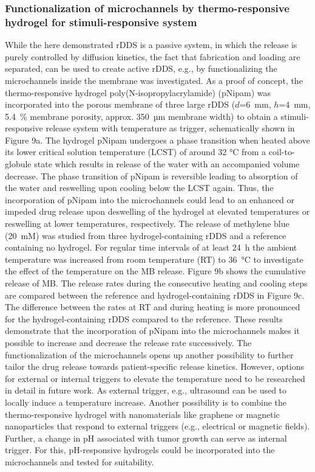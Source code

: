 \subsubsection{Functionalization of microchannels by thermo-responsive hydrogel for stimuli-responsive system}
While the here demonstrated rDDS is a passive system, in which the release is purely controlled by diffusion kinetics, the fact that fabrication and loading are separated, can be used to create active rDDS, e.g., by functionalizing the microchannels inside the membrane was investigated. As a proof of concept, the thermo-responsive hydrogel poly(N-isopropylacrylamide) (pNipam) was incorporated into the porous membrane of three large rDDS ($d$=6~mm, $h$=4~mm, 5.4~\% membrane porosity, approx. 350~µm membrane width) to obtain a stimuli-responsive release system with temperature as trigger, schematically shown in Figure 9a. The hydrogel pNipam undergoes a phase transition when heated above its lower critical solution temperature (LCST) of around 32 °C from a coil-to-globule state which results in release of the water with an accompanied volume decrease\supercite{podewitz2019coil,ilmain1991volume,heskins1968solution}. The phase transition of pNipam is reversible leading to absorption of the water and reswelling upon cooling below the LCST again. Thus, the incorporation of pNipam into the microchannels could lead to an enhanced or impeded drug release upon deswelling of the hydrogel at elevated temperatures or reswelling at lower temperatures, respectively. The release of methylene blue (20~mM) was studied from three hydrogel-containing rDDS and a reference containing no hydrogel. For regular time intervals of at least 24~h the ambient temperature was increased from room temperature (RT) to 36~°C to investigate the effect of the temperature on the MB release. Figure 9b shows the cumulative release of MB. The release rates during the consecutive heating and cooling steps are compared between the reference and hydrogel-containing rDDS in Figure 9c. The difference between the rates at RT and during heating is more pronounced for the hydrogel-containing rDDS compared to the reference. These results demonstrate that the incorporation of pNipam into the microchannels makes it possible to increase and decrease the release rate successively. The functionalization of the microchannels opens up another possibility to further tailor the drug release towards patient-specific release kinetics. However, options for external or internal triggers to elevate the temperature need to be researched in detail in future work. As external trigger, e.g., ultrasound can be used to locally induce a temperature increase\supercite{timko2010remotely}. Another possibility is to combine the thermo-responsive hydrogel with nanomaterials like graphene or magnetic nanoparticles that respond to external triggers (e.g., electrical or magnetic fields)\supercite{gu2019graphene}. Further, a change in pH associated with tumor growth can serve as internal trigger. For this, pH-responsive hydrogels could be incorporated into the microchannels and tested for suitability\supercite{andrade2021stimuli}. 

